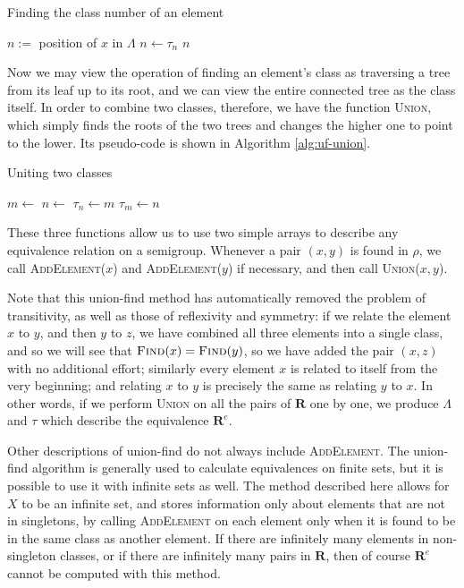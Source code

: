\begin{algorithm}
\caption{Finding the class number of an element}
\label{alg:uf-find}
  \begin{algorithmic}
      \State $n := $ position of $x$ in $\Lambda$
      \Repeat
        \State $n \gets \tau_n$
      \State \Return $n$
    \EndProcedure
  \end{algorithmic}
\end{algorithm}

Now we may view the operation of finding an element's class as traversing a tree
from its leaf up to its root, and we can view the entire connected tree as the
class itself.  In order to combine two classes, therefore, we have the function
\textsc{Union}, which simply finds the roots of the two trees and changes the
higher one to point to the lower.  Its pseudo-code is shown in Algorithm
\ref{alg:uf-union}.

\begin{algorithm}
\caption{Uniting two classes}
\label{alg:uf-union}
  \begin{algorithmic}
      \State $m \gets $ 
      \State $n \gets $ 
        \State $\tau_n \gets m$
        \State $\tau_m \gets n$
      \EndIf
    \EndProcedure
  \end{algorithmic}
\end{algorithm}

These three functions allow us to use two simple arrays to describe any
equivalence relation on a semigroup.  Whenever a pair $(x,y)$ is found in
$\rho$, we call \textsc{AddElement($x$)} and \textsc{AddElement($y$)} if
necessary, and then call \textsc{Union($x,y$)}.

Note that this union-find method has automatically removed the problem of
transitivity, as well as those of reflexivity and symmetry: if we relate the
element $x$ to $y$, and then $y$ to $z$, we have combined all three elements
into a single class, and so we will see that
$\textsc{Find}(x) = \textsc{Find}(y)$, so we have added the pair $(x,z)$ with no
additional effort; similarly every element $x$ is related to itself from the
very beginning; and relating $x$ to $y$ is precisely the same as relating $y$ to
$x$.  In other words, if we perform \textsc{Union} on all the pairs of
$\mathbf{R}$ one by one, we produce $\Lambda$ and $\tau$ which describe the
equivalence $\mathbf{R}^e$.

Other descriptions of union-find do not always include \textsc{AddElement}.  The
union-find algorithm is generally used to calculate equivalences on finite sets,
but it is possible to use it with infinite sets as well.  The method described
here allows for $X$ to be an infinite set, and stores information only about
elements that are not in singletons, by calling \textsc{AddElement} on each
element only when it is found to be in the same class as another element.  If
there are infinitely many elements in non-singleton classes, or if there are
infinitely many pairs in $\mathbf{R}$, then of course $\mathbf{R}^e$ cannot be
computed with this method.

